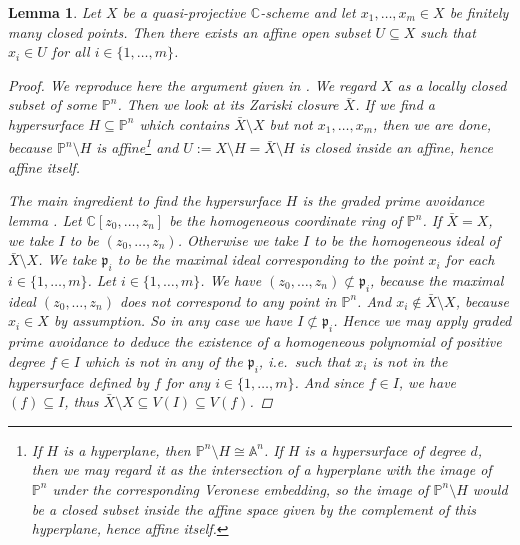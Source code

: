 \documentclass[12pt,a4paper]{amsart}
\theoremstyle{plain}
\newtheorem{lm}[thm]{Lemma}
\theoremstyle{definition}
\theoremstyle{remark}
\begin{document}
\begin{lm}\label{lm:avoidpoints}
  Let $X$ be a quasi-projective $\mathbb{C}$-scheme and let $x_{1},\ldots, x_{m} \in X$ be finitely many closed points.
  Then there exists an affine open subset $U \subseteq X$ such that $x_{i} \in U$ for all $i \in \{ 1, \ldots, m\}$.
  \begin{proof}
    We reproduce here the argument given in \cite[Appendix A]{mus11}.
    We regard $X$ as a locally closed subset of some $\mathbb{P}^{n}$.
    Then we look at its Zariski closure $\bar{X}$.
    If we find a hypersurface $H \subseteq \mathbb{P}^{n}$ which contains $\bar{X} \setminus X$ but not $x_{1}, \ldots, x_{m}$, then we are done, because $\mathbb{P}^{n} \setminus H$ is affine\footnote{If $H$ is a hyperplane, then $\mathbb{P}^{n} \setminus H \cong \mathbb{A}^{n}$.
    If $H$ is a hypersurface of degree $d$, then we may regard it as the intersection of a hyperplane with the image of $\mathbb{P}^{n}$ under the corresponding Veronese embedding, so the image of $\mathbb{P}^{n} \setminus H$ would be a closed subset inside the affine space given by the complement of this hyperplane, hence affine itself.} and $U := X \setminus H = \bar{X} \setminus H$ is closed inside an affine, hence affine itself.
    
    The main ingredient to find the hypersurface $H$ is the graded prime avoidance lemma \cite[\href{https://stacks.math.columbia.edu/tag/00JS}{Tag 00JS}]{stacks-project}.
    Let $\mathbb{C}[z_{0},\ldots,z_{n}]$ be the homogeneous coordinate ring of $\mathbb{P}^{n}$.
    If $\bar{X} = X$, we take $I$ to be $(z_{0}, \ldots, z_{n})$.
    Otherwise we take $I$ to be the homogeneous ideal of $\bar{X} \setminus X$.
    We take $\mathfrak{p}_{i}$ to be the maximal ideal corresponding to the point $x_{i}$ for each $i \in \{1, \ldots, m\}$.
    Let $i \in \{ 1, \ldots, m\}$.
    We have $(z_{0}, \ldots, z_{n}) \not\subset \mathfrak{p}_{i}$, because the maximal ideal $(z_{0}, \ldots, z_{n})$ does not correspond to any point in $\mathbb{P}^{n}$.
    And $x_{i} \not \in \bar{X} \setminus X$, because $x_{i} \in X$ by assumption.
    So in any case we have $I \not \subset \mathfrak{p}_{i}$.
    Hence we may apply graded prime avoidance to deduce the existence of a homogeneous polynomial of positive degree $f \in I$ which is not in any of the $\mathfrak{p}_{i}$, i.e.~such that $x_{i}$ is not in the hypersurface defined by $f$ for any $i \in \{1, \ldots, m\}$.
    And since $f \in I$, we have $(f) \subseteq I$, thus $\bar{X} \setminus X \subseteq V(I) \subseteq V(f)$.
  \end{proof}
\end{lm}
\end{document}
